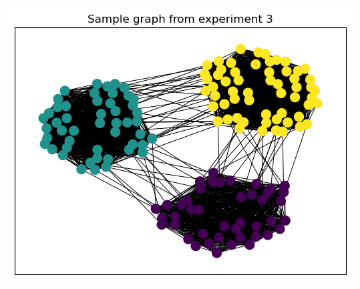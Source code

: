 \documentclass[switch, 12pt]{article}
\begin{document}
\begin{figure}[h]
\begin{subfigure}{0.28\linewidth}
    \end{subfigure}
    \hfill
    \begin{subfigure}{0.28\linewidth}
        \centering
        \includegraphics[width=\linewidth]{figures/exp3_sample.png}
    \end{subfigure}
    \hfill

    \medskip


\end{figure}
\end{document}
